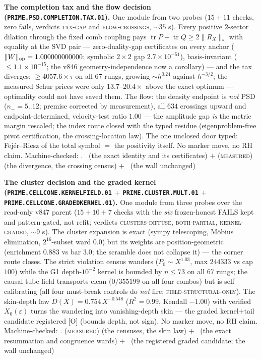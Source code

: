 \documentclass[11pt,a4paper]{article}
\theoremstyle{definition}
\begin{document}
\par\smallskip\noindent\textbf{The completion tax and the flow
decision (\texttt{PRIME.PSD.COMPLETION.TAX.01}).}
One module from two probes ($15 + 11$ checks, zero fails,
verdicts \textsc{tax-gap} and \textsc{flow-crossings},
${\sim}35$ s).  Every positive $2$-sector dilation through the
fixed comb coupling pays $\operatorname{tr}P + \operatorname{tr}Q
\ge 2\lVert R_X\rVert_{*}$ with equality at the SVD pair ---
zero-duality-gap certificates on every anchor ($\lVert
W\rVert_{\rm op} = 1.000000000000$; symbolic $2\times2$ gap
$2.7\times10^{-51}$), basis-invariant ($\le 1.1\times10^{-15}$;
the v846 geometry-independence now a corollary) --- and the tax
diverges: $\ge 4057.6\times\tau$ on all $67$ rungs, growing
$\sim h^{0.24}$ against $h^{-3/2}$; the measured Schur prices
were only $13.7$--$20.4\times$ above the exact optimum ---
optimality could not have saved them.  The flow: the density
endpoint is \emph{not} PSD ($n_- = 5..12$; premise corrected by
measurement), all $634$ crossings upward and endpoint-determined,
velocity-test ratio $1.00$ --- the amplitude gap \emph{is} the
metric margin rescaled; the index route closed with the typed
residue (eigenproblem-free pivot certification, the
crossing-location law).  The one unclosed door typed:
Fej\'er--Riesz of the total symbol $=$ the positivity itself.
No marker move, no RH claim.
Machine-checked: .
\mE\ (the exact identity and its certificates) $+$
(\textsc{measured}) (the divergence, the crossing census) $+$
\mO\ (the wall unchanged)
\par\smallskip

\par\smallskip\noindent\textbf{The cluster decision and the
graded kernel (\texttt{PRIME.CELLCONE.KERNELFIELD.01} $+$
\texttt{PRIME.CLUSTER.MULT.01} $+$
\texttt{PRIME.CELLCONE.GRADEDKERNEL.01}).}
One module from three probes over the read-only v847 parent
($15 + 10 + 7$ checks with the \emph{six} frozen-honest FAILS
kept and pattern-gated, not refit; verdicts
\textsc{clusters-diffuse}, \textsc{both-partial},
\textsc{kernel-graded}, ${\sim}9$ s).  The cluster expansion is
exact (sympy telescoping, M\"obius elimination, $2^{16}$-subset
ward $0.0$) but its weights are position-geometric (enrichment
$0.883$ vs bar $3.0$; the scramble does not collapse it) --- the
corner route closes.  The strict violation census wanders ($P_0
\sim X^{1.03}$, max $244333$ vs cap $100$) while the G1
depth-$10^{-2}$ kernel is bounded by $n \le 73$ on all $67$
rungs; the causal tube field transports clean ($0/355199$ on all
four combos) but is self-calibrating (all four must-break
controls do \emph{not} fire; \textsc{field-structural-only}).
The skin-depth law $D(X) = 0.754\,X^{-0.548}$ ($R^2 = 0.99$,
Kendall $-1.00$) with verified $X_0(\varepsilon)$ turns the
wandering into vanishing-depth skin --- the graded kernel$+$tail
candidate registered [O] (bounds depth, not sign).  No marker
move, no RH claim.
Machine-checked: .
(\textsc{measured}) (the censuses, the skin law) $+$ \mE\ (the
exact resummation and congruence wards) $+$ \mO\ (the registered
graded candidate; the wall unchanged)
\par\smallskip
\end{document}
